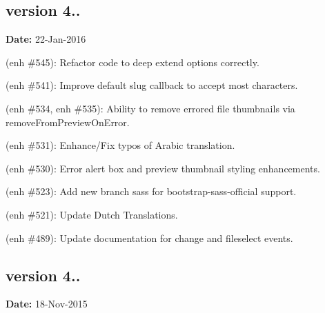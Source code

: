 \subsection*{version 4..}

{\bfseries Date\+:} 22-\/\+Jan-\/2016


\begin{DoxyItemize}
\item (enh \#545)\+: Refactor code to deep extend options correctly.
\item (enh \#541)\+: Improve default slug callback to accept most characters.
\item (enh \#534, enh \#535)\+: Ability to remove errored file thumbnails via {\ttfamily remove\+From\+Preview\+On\+Error}.
\item (enh \#531)\+: Enhance/\+Fix typos of Arabic translation.
\item (enh \#530)\+: Error alert box and preview thumbnail styling enhancements.
\item (enh \#523)\+: Add new branch {\ttfamily sass} for {\ttfamily bootstrap-\/sass-\/official} support.
\item (enh \#521)\+: Update Dutch Translations.
\item (enh \#489)\+: Update documentation for {\ttfamily change} and {\ttfamily fileselect} events.
\end{DoxyItemize}

\subsection*{version 4..}

{\bfseries Date\+:} 18-\/\+Nov-\/2015


